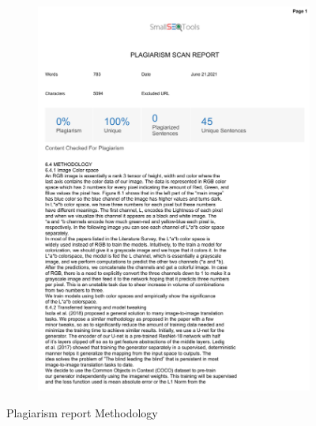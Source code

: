 \documentclass[oneside,a4paper,12pt]{report}
\begin{document}
\begin{appendices}
\begin{figure}
	\begin{subfigure}[H]{\textwidth}
		\centering
    	\includegraphics[scale=0.7, page=1]{plagiarism/methodology.pdf}
    \end{subfigure}
 \caption{Plagiarism report Methodology}
    \label{PlagiarismMethodology}
\end{figure}
\begin{figure}\ContinuedFloat
    \begin{subfigure}[H]{\textwidth}
    	\centering

\end{subfigure}
\end{figure}
\end{appendices}
\end{document}
